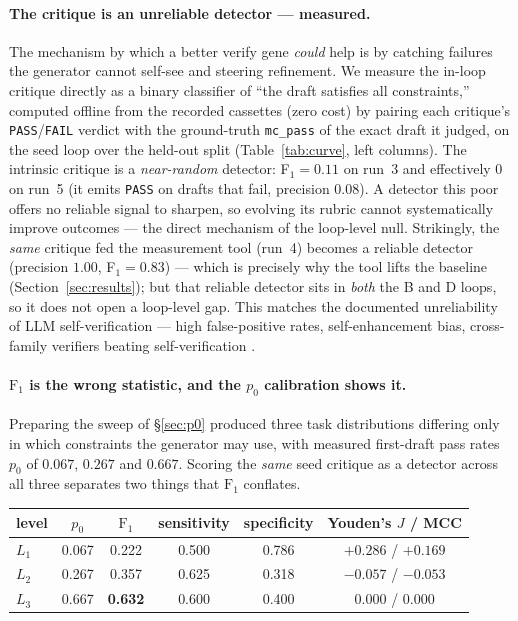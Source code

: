 \documentclass[11pt]{article}
\begin{document}
\paragraph{The critique is an unreliable detector --- measured.} The
mechanism by which a better verify gene \emph{could} help is by catching failures
the generator cannot self-see and steering refinement. We measure the in-loop
critique directly as a binary classifier of ``the draft satisfies all
constraints,'' computed offline from the recorded cassettes (zero cost) by
pairing each critique's \texttt{PASS}/\texttt{FAIL} verdict with the ground-truth
\texttt{mc\_pass} of the exact draft it judged, on the seed loop over the
held-out split (Table~\ref{tab:curve}, left columns). The intrinsic critique is a
\emph{near-random} detector: F$_1 = 0.11$ on run~3 and effectively $0$ on run~5
(it emits \texttt{PASS} on drafts that fail, precision $0.08$). A detector this
poor offers no reliable signal to sharpen, so evolving its rubric cannot
systematically improve outcomes --- the direct mechanism of the loop-level null.
Strikingly, the \emph{same} critique fed the measurement tool (run~4) becomes a
reliable detector (precision $1.00$, F$_1 = 0.83$) --- which is precisely why the
tool lifts the baseline (Section~\ref{sec:results}); but that reliable detector
sits in \emph{both} the B and D loops, so it does not open a loop-level gap. This
matches the documented unreliability of LLM self-verification --- high
false-positive rates, self-enhancement bias, cross-family verifiers beating
self-verification \citep{valmeekam2023selfcritique,huang2023cannot}.


\paragraph{$\mathrm{F}_1$ is the wrong statistic, and the $p_0$ calibration shows it.}
Preparing the sweep of \S\ref{sec:p0} produced three task distributions differing only in which
constraints the generator may use, with measured first-draft pass rates $p_0$ of $0.067$,
$0.267$ and $0.667$. Scoring the \emph{same} seed critique as a detector across all three
separates two things that $\mathrm{F}_1$ conflates.

\begin{center}\small
\begin{tabular}{lccccc}
\toprule
level & $p_0$ & $\mathrm{F}_1$ & sensitivity & specificity & Youden's $J$ / MCC \\
\midrule
$L_1$ & 0.067 & 0.222 & 0.500 & 0.786 & $+0.286$ / $+0.169$ \\
$L_2$ & 0.267 & 0.357 & 0.625 & 0.318 & $-0.057$ / $-0.053$ \\
$L_3$ & 0.667 & \textbf{0.632} & 0.600 & 0.400 & $\mathbf{0.000}$ / $\mathbf{0.000}$ \\
\bottomrule
\end{tabular}
\end{center}
\end{document}
